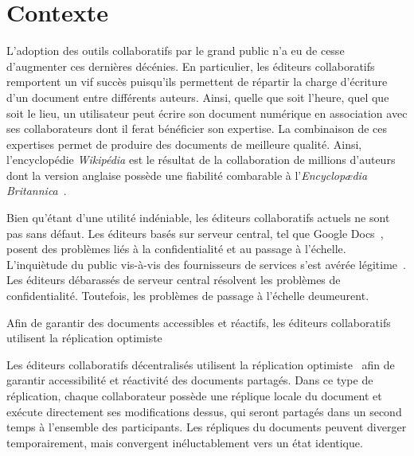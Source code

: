 
\section{Contexte}

L'adoption des outils collaboratifs par le grand public n'a eu de cesse
d'augmenter ces dernières décénies. En particulier, les éditeurs
collaboratifs~\cite{ellis1991groupware} remportent un vif succès puisqu'ils
permettent de répartir la charge d'écriture d'un document entre différents
auteurs. Ainsi, quelle que soit l'heure, quel que soit le lieu, un utilisateur
peut écrire son document numérique en association avec ses collaborateurs dont
il ferat bénéficier son expertise. La combinaison de ces expertises permet de
produire des documents de meilleure qualité. Ainsi, l'encyclopédie
\emph{Wikipédia} est le résultat de la collaboration de millions d'auteurs dont
la version anglaise possède une fiabilité combarable à l'\emph{Encyclop\ae{}dia
Britannica}~\cite{giles2005internet}.

Bien qu'étant d'une utilité indéniable, les éditeurs collaboratifs actuels ne
sont pas sans défaut. Les éditeurs basés sur serveur central, tel que Google
Docs~\cite{nichols1995high}, posent des problèmes liés à la confidentialité et
au passage à l'échelle. L'inquiètude du public vis-à-vis des fournisseurs de
services s'est avérée légitime~\cite{gellman2013us}. Les éditeurs débarassés de
serveur central résolvent les problèmes de confidentialité. Toutefois, les
problèmes de passage à l'échelle deumeurent.


Afin de garantir des documents accessibles et réactifs, les éditeurs
collaboratifs utilisent la réplication optimiste 

Les éditeurs collaboratifs décentralisés utilisent la réplication
optimiste~\cite{saito2005optimistic} afin de garantir accessibilité et
réactivité des documents partagés. Dans ce type de réplication, chaque
collaborateur possède une réplique locale du document et exécute directement ses
modifications dessus, qui seront partagés dans un second temps à l'ensemble des
participants. Les répliques du documents peuvent diverger temporairement, mais
convergent inéluctablement vers un état identique.

